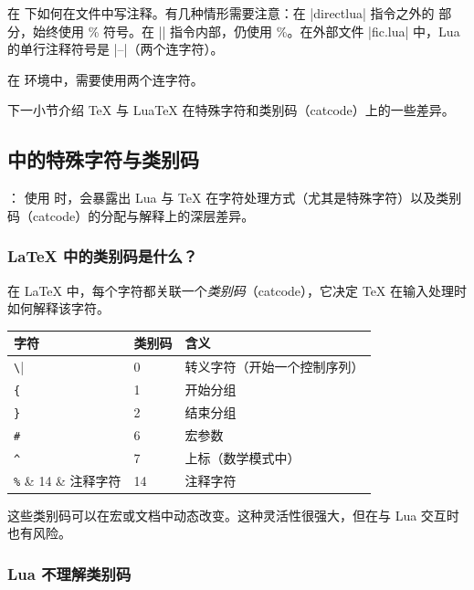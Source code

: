 \tkzRHand 在 \tkzEngine{\LUALATEX} 下如何在文件中写注释。有几种情形需要注意：在 |directlua| 指令之外的 \LATEX{} 部分，始终使用 \% 符号。在 |\directlua| 指令内部，仍使用 \%。在外部文件 |fic.lua| 中，Lua 的单行注释符号是 |--|（两个连字符）。

在  环境中，需要使用两个连字符。

下一小节介绍 \TeX{} 与 LuaTeX{} 在特殊字符和类别码（catcode）上的一些差异。

\subsection{ 中的特殊字符与类别码} %
\label{sub:special_characters_and_catcodes}

\tkzHand{\textcolor{red}{警告}}：
使用  时，会暴露出 Lua 与 \TeX{} 在字符处理方式（尤其是特殊字符）以及类别码（catcode）的分配与解释上的深层差异。

\subsubsection{\LaTeX{} 中的类别码是什么？} %
\label{ssub:what_are_catcodes}

在 \LaTeX{} 中，每个字符都关联一个\emph{类别码}（catcode），它决定 \TeX{} 在输入处理时如何解释该字符。


\begin{tabular}{lll}
\toprule
 \textbf{字符} & \textbf{类别码} & \textbf{含义} \\
 \midrule
 \verb|\| & 0 & 转义字符（开始一个控制序列） \\
\verb|{| & 1 & 开始分组 \\
\verb|}| & 2 & 结束分组 \\
\verb|#| & 6 & 宏参数 \\
\verb|^| & 7 & 上标（数学模式中） \\
\verb|%| & 14 & 注释字符 \\
 \bottomrule
 \end{tabular}


这些类别码可以在宏或文档中动态改变。这种灵活性很强大，但在与 Lua 交互时也有风险。


\subsubsection{Lua 不理解类别码} %
\label{sub:lua_does_not_understand_catcodes}


